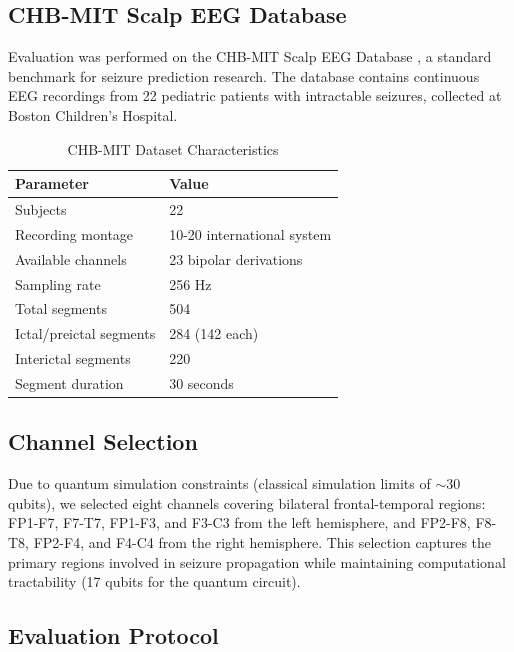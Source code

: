 \documentclass[pdflatex,sn-mathphys-num]{sn-jnl}
\begin{document}
\subsection{CHB-MIT Scalp EEG Database}
\label{sec:dataset}

Evaluation was performed on the CHB-MIT Scalp EEG Database \cite{goldberger2000,shoeb2009}, a standard benchmark for seizure prediction research. The database contains continuous EEG recordings from 22 pediatric patients with intractable seizures, collected at Boston Children's Hospital.

\begin{table}[htbp]
\centering
\caption{CHB-MIT Dataset Characteristics}
\label{tab:chbmit}
\begin{tabular}{ll}
\toprule
Parameter & Value \\
\midrule
Subjects & 22 \\
Recording montage & 10-20 international system \\
Available channels & 23 bipolar derivations \\
Sampling rate & 256 Hz \\
Total segments & 504 \\
Ictal/preictal segments & 284 (142 each) \\
Interictal segments & 220 \\
Segment duration & 30 seconds \\
\bottomrule
\end{tabular}
\end{table}

\subsection{Channel Selection}
\label{sec:channels}

Due to quantum simulation constraints (classical simulation limits of $\sim$30 qubits), we selected eight channels covering bilateral frontal-temporal regions: FP1-F7, F7-T7, FP1-F3, and F3-C3 from the left hemisphere, and FP2-F8, F8-T8, FP2-F4, and F4-C4 from the right hemisphere. This selection captures the primary regions involved in seizure propagation while maintaining computational tractability (17 qubits for the quantum circuit).

\subsection{Evaluation Protocol}
\label{sec:protocol}
\end{document}
